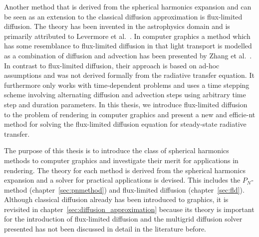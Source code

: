 Another method that is derived from the spherical harmonics expansion and can be seen as an extension to the classical diffusion approximation is flux-limited diffusion. The theory has been invented in the astrophysics domain and is primarily attributed to Levermore et al.~\cite{Levermore81}. In computer graphics a method which has some resemblance to flux-limited diffusion in that light transport is modelled as a combination of diffusion and advection has been presented by Zhang et al.~\cite{Zhang13}. In contrast to flux-limited diffusion, their approach is based on ad-hoc assumptions and was not derived formally from the radiative transfer equation. It furthermore only works with time-dependent problems and uses a time stepping scheme involving alternating diffusion and advection steps using arbitrary time step and duration parameters. In this thesis, we introduce flux-limited diffusion to the problem of rendering in computer graphics and present a new and efficie-nt method for solving the flux-limited diffusion equation for steady-state radiative transfer.

The purpose of this thesis is to introduce the class of spherical harmonics methods to computer graphics and investigate their merit for applications in rendering. The theory for each method is derived from the spherical harmonics expansion and a solver for practical applications is devised. This includes the $P_N$-method (chapter~\ref{sec:pnmethod}) and flux-limited diffusion (chapter~\ref{sec:fld}). Although classical diffusion already has been introduced to graphics, it is revisited in chapter~\ref{sec:diffusion_approximation} because its theory is important for the introduction of flux-limited diffusion and the multigrid diffusion solver presented has not been discussed in detail in the literature before.

